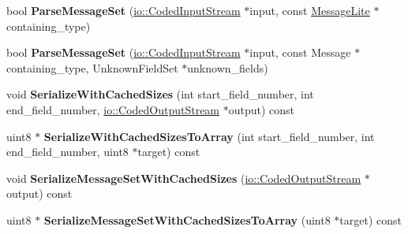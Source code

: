 \begin{DoxyCompactItemize}
\item 
\mbox{\label{classgoogle_1_1protobuf_1_1internal_1_1ExtensionSet_ab3a7bf69a19b825e92618184a8b7fc1b}} 
bool {\bfseries Parse\+Message\+Set} (\hyperlink{classgoogle_1_1protobuf_1_1io_1_1CodedInputStream}{io\+::\+Coded\+Input\+Stream} $\ast$input, const \hyperlink{classgoogle_1_1protobuf_1_1MessageLite}{Message\+Lite} $\ast$containing\+\_\+type)
\item 
\mbox{\label{classgoogle_1_1protobuf_1_1internal_1_1ExtensionSet_a3e5a0ba79066f010c19755ec827e34dd}} 
bool {\bfseries Parse\+Message\+Set} (\hyperlink{classgoogle_1_1protobuf_1_1io_1_1CodedInputStream}{io\+::\+Coded\+Input\+Stream} $\ast$input, const Message $\ast$containing\+\_\+type, Unknown\+Field\+Set $\ast$unknown\+\_\+fields)
\item 
\mbox{\label{classgoogle_1_1protobuf_1_1internal_1_1ExtensionSet_a8f38c13c7d5610a6cb7c66670be76733}} 
void {\bfseries Serialize\+With\+Cached\+Sizes} (int start\+\_\+field\+\_\+number, int end\+\_\+field\+\_\+number, \hyperlink{classgoogle_1_1protobuf_1_1io_1_1CodedOutputStream}{io\+::\+Coded\+Output\+Stream} $\ast$output) const
\item 
\mbox{\label{classgoogle_1_1protobuf_1_1internal_1_1ExtensionSet_a09f4f9f663a9b9101705b655193b7435}} 
uint8 $\ast$ {\bfseries Serialize\+With\+Cached\+Sizes\+To\+Array} (int start\+\_\+field\+\_\+number, int end\+\_\+field\+\_\+number, uint8 $\ast$target) const
\item 
\mbox{\label{classgoogle_1_1protobuf_1_1internal_1_1ExtensionSet_a70b7d7a3f669a508df8d18d0713b3941}} 
void {\bfseries Serialize\+Message\+Set\+With\+Cached\+Sizes} (\hyperlink{classgoogle_1_1protobuf_1_1io_1_1CodedOutputStream}{io\+::\+Coded\+Output\+Stream} $\ast$output) const
\item 
\mbox{\label{classgoogle_1_1protobuf_1_1internal_1_1ExtensionSet_a963585f39c37e1ae6e1110a943cd43e3}} 
uint8 $\ast$ {\bfseries Serialize\+Message\+Set\+With\+Cached\+Sizes\+To\+Array} (uint8 $\ast$target) const

\end{DoxyCompactItemize}
